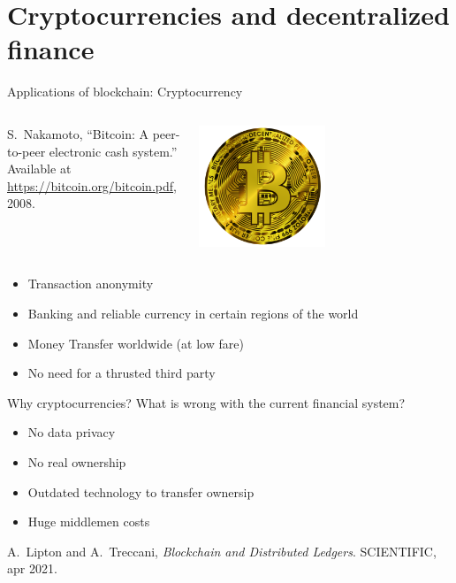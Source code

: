 \documentclass{beamer}
\begin{document}
\section{Cryptocurrencies and decentralized finance}
\begin{frame}{Applications of blockchain: Cryptocurrency}
\begin{columns}
\begin{column}{0.5\textwidth}
   
{\footnotesize
\begin{thebibliography}{1}
S.~Nakamoto, ``Bitcoin: A peer-to-peer electronic cash system.'' Available at
  \href{https://bitcoin.org/bitcoin.pdf}{https://bitcoin.org/bitcoin.pdf},
  2008.
\end{thebibliography}  
}
\end{column}
\begin{column}{0.5\textwidth}  %
    \begin{center}
     \includegraphics[width=0.5\textwidth]{../../Figures/bitcoin-6284869_1920.png}
     \end{center}
\end{column}
\end{columns}

\begin{itemize}
  \item Transaction anonymity
  \item Banking and reliable currency in certain regions of the world
  \item Money Transfer worldwide (at low fare)
  \item No need for a thrusted third party
\end{itemize}
\end{frame}
\begin{frame}{Why cryptocurrencies?}
What is wrong with the current financial system?
\begin{itemize}
  \item No data privacy
  \item No real ownership
  \item Outdated technology to transfer ownersip
  \item Huge middlemen costs
\end{itemize}
\scriptsize
\begin{thebibliography}{1}

A.~Lipton and A.~Treccani, {\em Blockchain and Distributed Ledgers}.
 {SCIENTIFIC}, apr 2021.

\end{thebibliography}


\end{frame}
\end{document}

